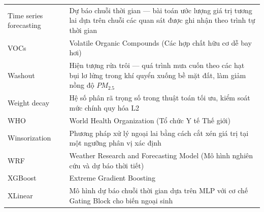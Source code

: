 \begin{longtable}{p{4.2cm} p{10.3cm}}
    Time series forecasting & Dự báo chuỗi thời gian --- bài toán ước lượng giá trị tương lai dựa trên chuỗi các quan sát được ghi nhận theo trình tự thời gian \\
    VOCs & Volatile Organic Compounds (Các hợp chất hữu cơ dễ bay hơi) \\
    Washout & Hiện tượng rửa trôi --- quá trình mưa cuốn theo các hạt bụi lơ lửng trong khí quyển xuống bề mặt đất, làm giảm nồng độ $PM_{2.5}$ \\
    Weight decay & Hệ số phân rã trọng số trong thuật toán tối ưu, kiểm soát mức chính quy hóa L2 \\
    WHO & World Health Organization (Tổ chức Y tế Thế giới) \\
    Winsorization & Phương pháp xử lý ngoại lai bằng cách cắt xén giá trị tại một ngưỡng phân vị xác định \\
    WRF & Weather Research and Forecasting Model (Mô hình nghiên cứu và dự báo thời tiết) \\
    XGBoost & Extreme Gradient Boosting \\
    XLinear & Mô hình dự báo chuỗi thời gian dựa trên MLP với cơ chế Gating Block cho biến ngoại sinh \\
    \bottomrule
\end{longtable}

